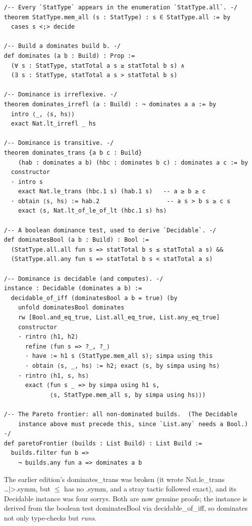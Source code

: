 \documentclass[11pt, a4paper, oneside]{book}
\newcommand{\li}[1]{{\ttfamily\small\color{deepblue}#1}}
\begin{document}
\begin{leanbox}[title={Lean 4 --- Pareto Dominance and Frontier (fully proved)}]
\begin{verbatim}
/-- Every `StatType` appears in the enumeration `StatType.all`. -/
theorem StatType.mem_all (s : StatType) : s ∈ StatType.all := by
  cases s <;> decide

/-- Build a dominates build b. -/
def dominates (a b : Build) : Prop :=
  (∀ s : StatType, statTotal a s ≥ statTotal b s) ∧
  (∃ s : StatType, statTotal a s > statTotal b s)

/-- Dominance is irreflexive. -/
theorem dominates_irrefl (a : Build) : ¬ dominates a a := by
  intro ⟨_, ⟨s, hs⟩⟩
  exact Nat.lt_irrefl _ hs

/-- Dominance is transitive. -/
theorem dominates_trans {a b c : Build}
    (hab : dominates a b) (hbc : dominates b c) : dominates a c := by
  constructor
  · intro s
    exact Nat.le_trans (hbc.1 s) (hab.1 s)   -- a ≥ b ≥ c
  · obtain ⟨s, hs⟩ := hab.2                   -- a s > b s ≥ c s
    exact ⟨s, Nat.lt_of_le_of_lt (hbc.1 s) hs⟩

/-- A boolean dominance test, used to derive `Decidable`. -/
def dominatesBool (a b : Build) : Bool :=
  (StatType.all.all fun s => statTotal b s ≤ statTotal a s) &&
  (StatType.all.any fun s => statTotal b s < statTotal a s)

/-- Dominance is decidable (and computes). -/
instance : Decidable (dominates a b) :=
  decidable_of_iff (dominatesBool a b = true) (by
    unfold dominatesBool dominates
    rw [Bool.and_eq_true, List.all_eq_true, List.any_eq_true]
    constructor
    · rintro ⟨h1, h2⟩
      refine ⟨fun s => ?_, ?_⟩
      · have := h1 s (StatType.mem_all s); simpa using this
      · obtain ⟨s, _, hs⟩ := h2; exact ⟨s, by simpa using hs⟩
    · rintro ⟨h1, s, hs⟩
      exact ⟨fun s _ => by simpa using h1 s,
             ⟨s, StatType.mem_all s, by simpa using hs⟩⟩)

/-- The Pareto frontier: all non-dominated builds.  (The Decidable
    instance above must precede this, since `List.any` needs a Bool.) -/
def paretoFrontier (builds : List Build) : List Build :=
  builds.filter fun b =>
    ¬ builds.any fun a => dominates a b
\end{verbatim}
\end{leanbox}

The earlier edition's \li{dominates\_trans} was broken (it wrote
\li{Nat.le\_trans …|>.symm}, but $\leq$ has no \li{.symm}, and a stray tactic
followed \li{exact}), and its \li{Decidable} instance was four \li{sorry}s.  Both
are now genuine proofs; the instance is derived from the boolean test
\li{dominatesBool} via \li{decidable\_of\_iff}, so \li{dominates} not only
type-checks but \emph{runs}.
\end{document}
